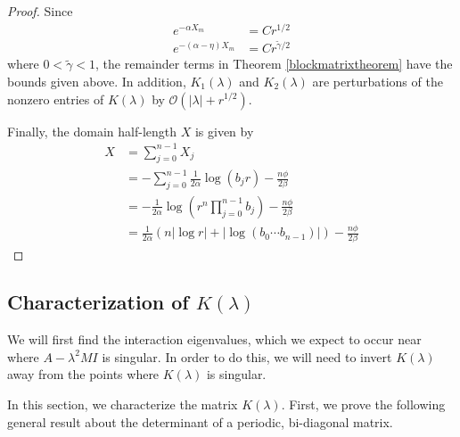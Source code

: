 \documentclass[thesis.tex]{subfiles}
\begin{document}
\begin{lemma}
\begin{proof}
Since
\begin{align*}
e^{-\alpha X_m} &= C r^{1/2} \\
e^{-(\alpha - \eta) X_m} &= C r^{\tilde{\gamma}/2}
\end{align*}
where $0 < \tilde{\gamma} < 1$, the remainder terms in Theorem \ref{blockmatrixtheorem} have the bounds given above. In addition, $K_1(\lambda)$ and $K_2(\lambda)$ are perturbations of the nonzero entries of $K(\lambda)$ by $\mathcal{O}(|\lambda| + r^{1/2})$.

Finally, the domain half-length $X$ is given by
\begin{align*}
X &= \sum_{j=0}^{n-1} X_j \\
&= -\sum_{j=0}^{n-1} \frac{1}{2\alpha}\log(b_j r) - \frac{n \phi}{2 \beta}\\
&= -\frac{1}{2\alpha} \log\left( r^n \prod_{j=0}^{n-1} b_j \right) - \frac{n \phi}{2 \beta} \\
&= \frac{1}{2\alpha} (n |\log r| + |\log (b_0\cdots b_{n-1})| ) - \frac{n \phi}{2 \beta}
\end{align*}
\end{proof}
\end{lemma}

\subsection{Characterization of \texorpdfstring{$K(\lambda)$}{K} }

We will first find the interaction eigenvalues, which we expect to occur near where $A - \lambda^2 M I$ is singular. In order to do this, we will need to invert $K(\lambda)$ away from the points where $K(\lambda)$ is singular.

In this section, we characterize the matrix $K(\lambda)$. First, we prove the following general result about the determinant of a periodic, bi-diagonal matrix.
\end{document}
